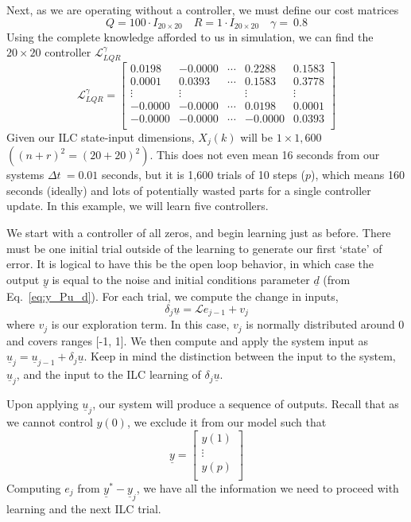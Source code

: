 Next, as we are operating without a controller, we must define our cost matrices
\begin{equation}
    Q=100\cdot I_{20\times 20}
    \quad
    R=1\cdot I_{20\times 20}
    \quad
    \gamma=\ 0.8
    \label{eq:rl_ilc_params}
\end{equation}
Using the complete knowledge afforded to us in simulation, we can find the $20 \times20$ controller $\mathcal{L}_{LQR}^\gamma$
\begin{equation}
    \mathcal{L}_{LQR}^\gamma=\left[\begin{matrix}0.0198&-0.0000&\cdots&0.2288&0.1583\\0.0001&0.0393&\cdots&0.1583&0.3778\\\vdots&\vdots&&\vdots&\vdots\\-0.0000&-0.0000&\cdots&0.0198&0.0001\\-0.0000&-0.0000&\cdots&-0.0000&0.0393\\\end{matrix}\right]
    \label{eq:ilc_lqr_controller}
\end{equation}
Given our ILC state-input dimensions, $X_j\left(k\right)$ will be $1 \times1,600$ $({\left(n+r\right)}^2={\left(20+20\right)}^2)$. This does not even mean 16 seconds from our systems $\Delta t\ = 0.01$ seconds, but it is 1,600 trials of 10 steps ($p$), which means 160 seconds (ideally) and lots of potentially wasted parts for a single controller update. In this example, we will learn five controllers.

We start with a controller of all zeros, and begin learning just as before. There must be one initial trial outside of the learning to generate our first `state' of error. It is logical to have this be the open loop behavior, in which case the output $\underline{y}$ is equal to the noise and initial conditions parameter $\underline{d}$ (from Eq.~\ref{eq:y_Pu_d}). For each trial, we compute the change in inputs,
\begin{equation}
    \delta_j\underline{u}=\mathcal{L}e_{j-1}+v_j
    \label{eq:rl_ilc_input}
\end{equation}
where $v_j$ is our exploration term. In this case, $v_j$ is normally distributed around 0 and covers ranges [-1, 1]. We then compute and apply the system input as ${\underline{u}}_j={\underline{u}}_{j-1}+\delta_j\underline{u}$. Keep in mind the distinction between the input to the system, ${\underline{u}}_j$, and the input to the ILC learning of $\delta_j\underline{u}$.

Upon applying ${\underline{u}}_j$, our system will produce a sequence of outputs. Recall that as we cannot control $y\left(0\right)$, we exclude it from our model such that
\begin{equation}
    \underline{y}=\left[\begin{matrix}y\left(1\right)\\\vdots\\y\left(p\right)\\\end{matrix}\right]
\end{equation}
Computing $e_j$ from ${\underline{y}}^\ast-{\underline{y}}_j$, we have all the information we need to proceed with learning and the next ILC trial.

